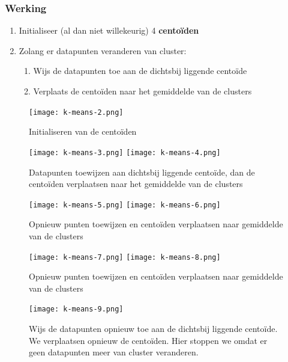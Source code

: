 \documentclass{article}
\begin{document}
\subsubsection{Werking}

\begin{enumerate}
    \item Initialiseer (al dan niet willekeurig) 4 \textbf{centoïden}
    \item Zolang er datapunten veranderen van cluster:
    \begin{enumerate}
        \item Wijs de datapunten toe aan de dichtsbij liggende centoïde 
        \item Verplaats de centoïden naar het gemiddelde van de clusters
    \end{enumerate}
\end{enumerate}

\begin{figure}[H]
    \centering
    \texttt{[image: k-means-2.png]}
    \caption{Initialiseren van de centoïden}
\end{figure}

\begin{figure}[H]
    \centering
    \texttt{[image: k-means-3.png]}
    \texttt{[image: k-means-4.png]}
    \caption{Datapunten toewijzen aan dichtsbij liggende centoïde, dan de centoïden verplaatsen naar het gemiddelde van de clusters}
\end{figure}


\begin{figure}[H]
    \centering
    \texttt{[image: k-means-5.png]}
    \texttt{[image: k-means-6.png]}
    \caption{Opnieuw punten toewijzen en centoïden verplaatsen naar gemiddelde van de clusters}
\end{figure}

\begin{figure}[H]
    \centering
    \texttt{[image: k-means-7.png]}
    \texttt{[image: k-means-8.png]}
    \caption{Opnieuw punten toewijzen en centoïden verplaatsen naar gemiddelde van de clusters}
\end{figure}

\begin{figure}[H]
    \centering
    \texttt{[image: k-means-9.png]}
    \caption{Wijs de datapunten opnieuw toe aan de dichtsbij liggende centoïde. We verplaatsen opnieuw de centoïden. Hier stoppen we omdat er geen datapunten meer van cluster veranderen.}
\end{figure}
\end{document}
